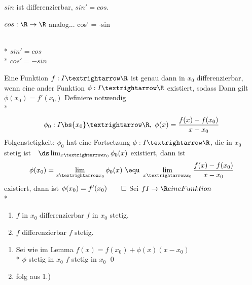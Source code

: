 {{\Rarr{} $sin$ ist differenzierbar, $sin' = cos$.}
\item{$cos: \R \to \R $ analog... cos' = -sin \\
\\*
$ sin' = cos $ \\*
$ cos' = -sin $ }
}

Eine Funktion $f:I→\R$ ist genau dann in $x_0$ differenzierbar, wenn eine ander Funktion $\phi:I→\R$ existiert, sodass
Dann gilt $\phi(x_0) =f'(x_0)$
\bew
Definiere notwendig\\*
$$\phi_0:I\bs\{x_0\}→\R,\ \phi(x)=\frac{f(x)-f(x_0)}{x-x_0}$$
Folgenstetigkeit: $ \phi_0$ hat eine Fortsetzung $\phi:I→\R$, die in $x_0$ stetig ist\ \equ\ $\ds\lim_{x→x_0}\phi_0(x)$ existiert, dann ist 
$$\phi(x_0)=\lim_{x→x_0}\phi_0(x)\ \equ\ \lim_{x→x_0}\frac{f(x)-f(x_0)}{x-x_0}$$
existiert, dann ist $\phi(x_0)=f'(x_0)\qed$
Sei $f I \to \R eine Funktion$\\*
\begin{enumerate}
\item{$f$ in $x_0$ differenzierbar \Rarr{} $f$ in $x_0$ stetig.}
\item{$f$ differenzierbar \Rarr{} $f$ stetig.}
\end{enumerate}
\bew
\begin{enumerate}
\item{Sei \phi wie im Lemma \Rarr{} $f(x) = f(x_0) + \phi(x)(x-x_0)$\\*
$\phi$ stetig in $x_0$ \Rarr{} $f$ stetig in $x_0$ \qed}
\item{folg aus 1.)}
\end{enumerate}

